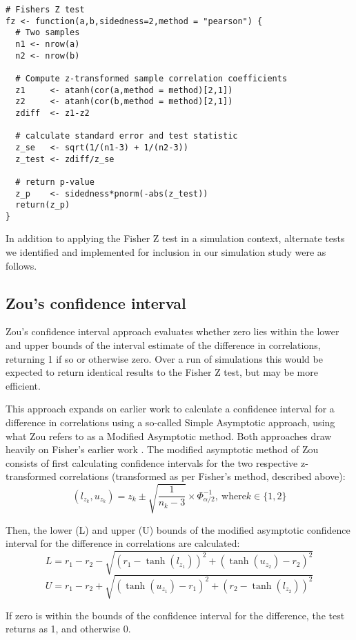 \begin{lstlisting}[caption={Fisher's Z test (simulation approach)}]
# Fishers Z test
fz <- function(a,b,sidedness=2,method = "pearson") {
  # Two samples
  n1 <- nrow(a)
  n2 <- nrow(b)
   
  # Compute z-transformed sample correlation coefficients
  z1     <- atanh(cor(a,method = method)[2,1])
  z2     <- atanh(cor(b,method = method)[2,1])
  zdiff  <- z1-z2
  
  # calculate standard error and test statistic
  z_se   <- sqrt(1/(n1-3) + 1/(n2-3))
  z_test <- zdiff/z_se
  
  # return p-value
  z_p    <- sidedness*pnorm(-abs(z_test))
  return(z_p)
}
\end{lstlisting}


In addition to applying the Fisher Z test in a simulation context, alternate tests we identified and implemented for inclusion in our simulation study were as follows. 

\subsection{Zou's confidence interval}
Zou's confidence interval approach evaluates whether zero lies within the lower and upper bounds of the interval estimate of the difference in correlations, returning 1 if so or otherwise zero.  Over a run of simulations this would be expected to return identical results to the Fisher Z test, but may be more efficient.

This approach \cite{Zou2007} expands on earlier work \cite{Olkin1995} to calculate a confidence interval for a difference in correlations using a so-called Simple Asymptotic approach, using what Zou refers to as a Modified Asymptotic method.  Both approaches draw heavily on Fisher's earlier work \cite{Fisher1990}.  The modified asymptotic method of Zou consists of first calculating confidence intervals for the two respective z-transformed correlations (transformed as per Fisher's method, described above):
$$(l_z_k, u_z_k) = z_k \pm \sqrt{\frac{1}{n_k - 3}} \times \Phi_{\alpha/2}^{-1},\ \text{where} k \in \{1,2\}$$

Then, the lower (L) and upper (U) bounds of the modified asymptotic confidence interval for the difference in correlations are calculated:
$$L = r_1 - r_2 - \sqrt{(r_1 - \tanh(l_z_1))^2 + (\tanh(u_z_2)- r_2)^2}$$
$$U = r_1 - r_2 + \sqrt{(\tanh(u_z_1) - r_1)^2 + (r_2 - \tanh(l_z_2))^2}$$

If zero is within the bounds of the confidence interval for the difference, the test returns as 1, and otherwise 0.

